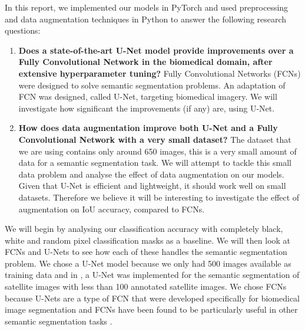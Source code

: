 \documentclass{article}
\begin{document}
In this report, we implemented our models in PyTorch \citep{pytorch} and used preprocessing and data augmentation techniques in Python to answer the following research questions:
\begin{samepage}
\begin{enumerate}
    \item \textbf{Does a state-of-the-art U-Net model provide improvements over a Fully Convolutional Network in the biomedical domain, after extensive hyperparameter tuning?}
    Fully Convolutional Networks (FCNs) were designed to solve semantic segmentation problems. An adaptation of FCN was designed, called U-Net, targeting biomedical imagery. We will investigate how significant the improvements (if any) are, using U-Net.  
    \item \textbf{How does data augmentation improve both U-Net and a Fully Convolutional Network with a very small dataset?}
    The dataset that we are using contains only around 650 images, this is a very small amount of data for a semantic segmentation task. We will attempt to tackle this small data problem and analyse the effect of data augmentation on our models. Given that U-Net is efficient and lightweight, it should work well on small datasets. Therefore we believe it will be interesting to investigate the effect of augmentation on IoU accuracy, compared to FCNs.
\end{enumerate}
\end{samepage}
 
We will begin by analysing our classification accuracy with completely black, white and random pixel classification masks as a baseline. We will then look at FCNs and U-Nets to see how each of these handles the semantic segmentation problem. We chose a U-Net model because we only had 500 images available as training data and in \cite{MicrosoftUnetSmallData}, a U-Net was implemented for the semantic segmentation of satellite images with less than 100 annotated satellite images. We chose FCNs because U-Nets are a type of FCN that were developed specifically for biomedical image segmentation \cite{Ronneberger2015UNetCN} and FCNs have been found to be particularly useful in other semantic segmentation tasks \cite{Long2015FullyCN}.
\end{document}
